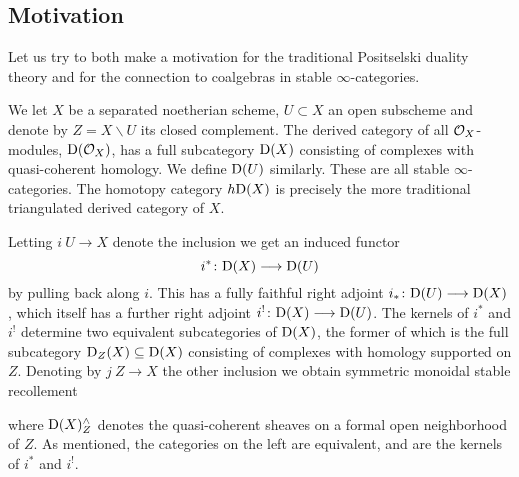 \subsection*{Motivation}

Let us try to both make a motivation for the traditional Positselski duality theory and for the connection to coalgebras in stable $\infty$-categories. 

We let $X$ be a separated noetherian scheme, $U\subset X$ an open subscheme and denote by $Z = X\backslash U$ its closed complement. The derived category of all $\mathcal{O}_X$-modules, $\mathrm{D}(\mathcal{O}_X)$, has a full subcategory $\mathrm{D}(X)$ consisting of complexes with quasi-coherent homology. We define $\mathrm{D}(U)$ similarly. These are all stable $\infty$-categories. The homotopy category $h\mathrm{D}(X)$ is precisely the more traditional triangulated derived category of $X$. 

Letting $i\:U\to X$ denote the inclusion we get an induced functor 
\[i^*\colon \mathrm{D}(X)\longrightarrow \mathrm{D}(U)\]
by pulling back along $i$. This has a fully faithful right adjoint $i_*\colon \mathrm{D}(U)\longrightarrow \mathrm{D}(X)$, which itself has a further right adjoint $i^!\colon \mathrm{D}(X)\longrightarrow \mathrm{D}(U)$. The kernels of $i^*$ and $i^!$ determine two equivalent subcategories of $\mathrm{D}(X)$, the former of which is the full subcategory $\mathrm{D}_Z(X)\subseteq \mathrm{D}(X)$ consisting of complexes with homology supported on $Z$. Denoting by $j\: Z\to X$ the other inclusion we obtain symmetric monoidal stable recollement
\begin{center}
\end{center}
where $\mathrm{D}(X)^\wedge_Z$ denotes the quasi-coherent sheaves on a formal open neighborhood of $Z$. As mentioned, the categories on the left are equivalent, and are the kernels of $i^*$ and $i^!$. 

